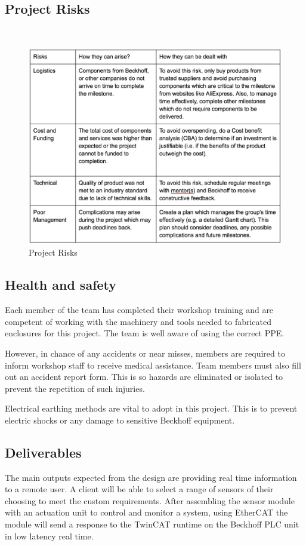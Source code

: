\documentclass[a4paper, 10pt, conference]{IEEEconf}
\begin{document}
\subsection{Project Risks}
\
\begin{figure}[h!]
  \includegraphics[width=\linewidth]{images/Management}
  \caption{Project Risks}
  \label{fig:ProjectRisks}
\end{figure}

\subsection{Health and safety}
Each member of the team has completed their workshop training and are competent of working with the machinery and tools needed to fabricated enclosures for this project. The team is well aware of using the correct PPE.

However, in chance of any accidents or near misses, members are required to inform workshop staff to receive medical assistance. Team members must also fill out an accident report form. This is so hazards are eliminated or isolated to prevent the repetition of such injuries.

Electrical earthing methods are vital to adopt in this project. This is to prevent electric shocks or any damage to sensitive Beckhoff equipment. 

\subsection{Deliverables}
The main outputs expected from the design are providing real time information to a remote user. A client will be able to select a range of sensors of their choosing to meet the custom requirements. After assembling the sensor module with an actuation unit to control and monitor a system, using EtherCAT the module will send a response to the TwinCAT runtime on the Beckhoff PLC unit in low latency real time. 
\end{document}
